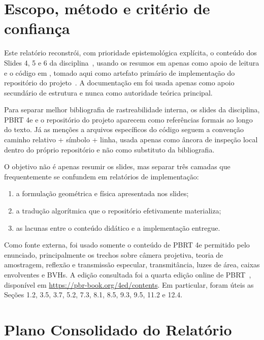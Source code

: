 \documentclass[portuguese]{sbcreviews-2025}%
\begin{document}
\section{Escopo, método e critério de confiança}
\label{sec:escopo}

Este relatório reconstrói, com prioridade epistemológica explícita, o conteúdo dos Slides 4, 5 e 6 da disciplina~\citep{inf2608slides04,inf2608slides05,inf2608slides06}, usando os resumos em  apenas como apoio de leitura e o código em , tomado aqui como artefato primário de implementação do repositório do projeto~\citep{inf2608projectrepo}. A documentação em  foi usada apenas como apoio secundário de estrutura e nunca como autoridade teórica principal.

Para separar melhor bibliografia de rastreabilidade interna, os slides da disciplina, PBRT 4e e o repositório do projeto aparecem como referências formais ao longo do texto. Já as menções a arquivos específicos do código seguem a convenção caminho relativo + símbolo + linha, usada apenas como âncora de inspeção local dentro do próprio repositório e não como substituto da bibliografia.

O objetivo não é apenas resumir os slides, mas separar três camadas que frequentemente se confundem em relatórios de implementação:

\begin{enumerate}
    \item a formulação geométrica e física apresentada nos slides;
    \item a tradução algorítmica que o repositório efetivamente materializa;
    \item as lacunas entre o conteúdo didático e a implementação entregue.
\end{enumerate}

Como fonte externa, foi usado somente o conteúdo de PBRT 4e permitido pelo enunciado, principalmente os trechos sobre câmera projetiva, teoria de amostragem, reflexão e transmissão especular, transmitância, luzes de área, caixas envolventes e BVHs. A edição consultada foi a quarta edição online de PBRT~\citep{pharr2023pbrt}, disponível em \url{https://pbr-book.org/4ed/contents}. Em particular, foram úteis as Seções 1.2, 3.5, 3.7, 5.2, 7.3, 8.1, 8.5, 9.3, 9.5, 11.2 e 12.4.

\section{Plano Consolidado do Relatório}
\label{sec:plano-relatorio}
\end{document}
